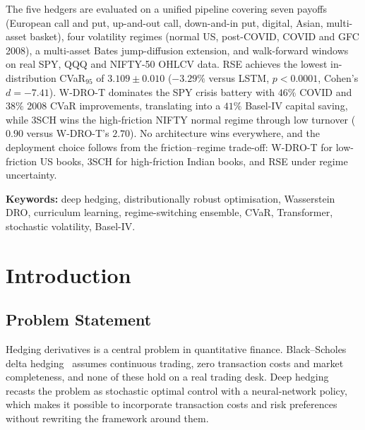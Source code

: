 \documentclass[11pt,oneside]{report}
\begin{document}
The five hedgers are evaluated on a unified pipeline covering seven payoffs (European call and put, up-and-out call, down-and-in put, digital, Asian, multi-asset basket), four volatility regimes (normal US, post-COVID, COVID and GFC 2008), a multi-asset Bates jump-diffusion extension, and walk-forward windows on real SPY, QQQ and NIFTY-50 OHLCV data. RSE achieves the lowest in-distribution CVaR$_{95}$ of $3.109 \pm 0.010$ ($-3.29\%$ versus LSTM, $p < 0.0001$, Cohen's $d = -7.41$). W-DRO-T dominates the SPY crisis battery with $46\%$ COVID and $38\%$ 2008 CVaR improvements, translating into a $41\%$ Basel-IV capital saving, while 3SCH wins the high-friction NIFTY normal regime through low turnover ($0.90$ versus W-DRO-T's $2.70$). No architecture wins everywhere, and the deployment choice follows from the friction--regime trade-off: W-DRO-T for low-friction US books, 3SCH for high-friction Indian books, and RSE under regime uncertainty.

\vspace{0.6em}
\noindent\textbf{Keywords:} deep hedging, distributionally robust optimisation, Wasserstein DRO, curriculum learning, regime-switching ensemble, CVaR, Transformer, stochastic volatility, Basel-IV.

\clearpage

\tableofcontents
\clearpage
\listoffigures
\clearpage
\listoftables
\clearpage
{}

\chapter{Introduction}
\label{sec:introduction}

\section{Problem Statement}

Hedging derivatives is a central problem in quantitative finance. Black--Scholes delta hedging~\citep{black1973pricing} assumes continuous trading, zero transaction costs and market completeness, and none of these hold on a real trading desk. Deep hedging~\citep{buehler2019deep} recasts the problem as stochastic optimal control with a neural-network policy, which makes it possible to incorporate transaction costs and risk preferences without rewriting the framework around them.
\end{document}
